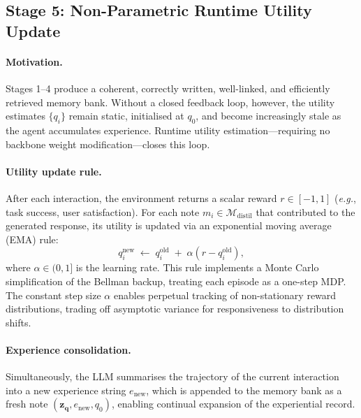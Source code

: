 \documentclass{article}
\newcommand{\memset}{\mathcal{M}}
\newcommand{\note}{m}
\newcommand{\eg}{\textit{e.g.},\xspace}
\begin{document}
\subsection{Stage 5: Non-Parametric Runtime Utility Update}
\label{sec:stage5}

\paragraph{Motivation.}
Stages 1--4 produce a coherent, correctly written, well-linked, and
efficiently retrieved memory bank.
Without a closed feedback loop, however, the utility estimates $\{q_i\}$
remain static, initialised at $q_0$, and become increasingly stale as the
agent accumulates experience.
Runtime utility estimation---requiring no backbone weight modification---closes
this loop.

\paragraph{Utility update rule.}
After each interaction, the environment returns a scalar reward
$r \in [-1, 1]$ (\eg task success, user satisfaction).
For each note $\note_i \in \memset_{\mathrm{distil}}$ that contributed to the
generated response, its utility is updated via an exponential moving average
(EMA) rule:
\begin{equation}
  q_i^{\mathrm{new}}
  \;\leftarrow\;
  q_i^{\mathrm{old}}
  \;+\;
  \alpha\!\left(r - q_i^{\mathrm{old}}\right),
  \label{eq:utility_update}
\end{equation}
where $\alpha \in (0,1]$ is the learning rate.
This rule implements a Monte Carlo simplification of the Bellman backup,
treating each episode as a one-step MDP.
The constant step size $\alpha$ enables perpetual tracking of non-stationary
reward distributions, trading off asymptotic variance for responsiveness to
distribution shifts.

\paragraph{Experience consolidation.}
Simultaneously, the LLM summarises the trajectory of the current interaction
into a new experience string $e_{\mathrm{new}}$, which is appended to the
memory bank as a fresh note $(\mathbf{z}_{\mathbf{q}}, e_{\mathrm{new}}, q_0)$,
enabling continual expansion of the experiential record.

\end{document}
